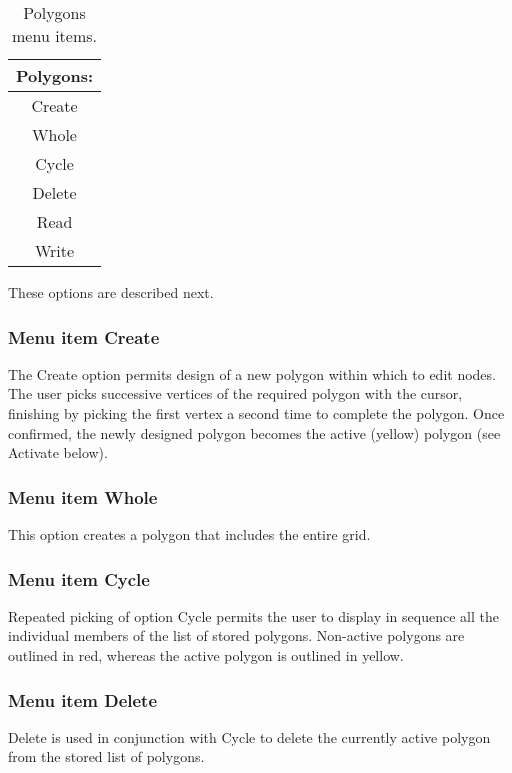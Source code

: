 \documentclass{article}
\begin{document}
\begin{table}[htb!]
 \caption{Polygons menu items.}
  \begin{center}
   \begin{tabular}{|c|}
    \hline
Polygons:\\     \hline
Create \\ Whole \\ Cycle \\ Delete \\ Read \\ Write \\
    \hline
   \end{tabular}
   \label{tab:POLYGONS}
  \end{center}
\end{table}


These options are described next.

\subsubsection[Menu item Create]{Menu item Create}
The Create option permits design of a new polygon within which to edit nodes. The user picks successive vertices of the required polygon with the cursor, finishing by picking the first vertex a second time to complete the polygon. Once confirmed, the newly designed polygon becomes the active (yellow) polygon (see Activate below).

\subsubsection[Menu item Whole]{Menu item Whole}
This option creates a polygon that includes the entire grid.

\subsubsection[Menu item Cycle]{Menu item Cycle}
Repeated picking of option Cycle permits the user to display in sequence all the individual members of the list of stored polygons. Non-active polygons are outlined in red, whereas the active polygon is outlined in yellow.

\subsubsection[Menu item Delete]{Menu item Delete}
Delete is used in conjunction with Cycle to delete the currently active polygon from the stored list of polygons.
\end{document}
